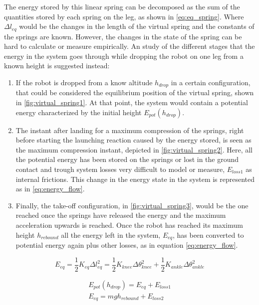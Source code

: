 The energy stored by this linear spring can be decomposed as the sum of the quantities stored by each spring on the leg, as shown in \ref{eq:eq_spring}.
Where $\Delta l_{eq}$ would be the changes in the length of the virtual spring and the constants of the springs are known.
However, the changes in the state of the spring can be hard to calculate or measure empirically.
An study of the different stages that the energy in the system goes through while dropping the robot on one leg from a known height is suggested instead:
\begin{enumerate}
    \item If the robot is dropped from a know altitude $h_{drop}$ in a certain configuration, that could be considered the equilibrium position of the virtual spring, shown in \ref{fig:virtual_spring1}. 
    At that point, the system would contain a potential energy characterized by the initial height $E_{pot}(h_{drop})$.
    \item The instant after landing for a maximum compression of the springs, right before starting the launching reaction caused by the energy stored, is seen as the maximum compression instant, depicted in \ref{fig:virtual_spring2}. 
    Here, all the potential energy has been stored on the springs or lost in the ground contact and trough system losses very difficult to model or measure, $E_{loss1}$ as internal frictions.
    This change in the energy state in the system is represented as in \ref{eq:energy_flow}.
    \item Finally, the take-off configuration, in \ref{fig:virtual_spring3}, would be the one reached once the springs have released the energy and the maximum acceleration upwards is reached. 
    Once the robot has reached its maximum height $h_{rebound}$ all the energy left in the system, $E_{eq}$, has been converted to potential energy again plus other losses, as in equation \ref{eq:energy_flow}.
\end{enumerate}

\begin{equation}
\label{eq:eq_spring}
    E_{eq} = \frac{1}{2}K_{eq}\Delta l^2_{eq} = \frac{1}{2}K_{knee} \Delta \theta^2_{knee} + \frac{1}{2}K_{ankle} \Delta \theta^2_{ankle}
\end{equation}

\begin{equation}
\label{eq:energy_flow}
    \begin{aligned}
        E_{pot}(h_{drop}) = E_{eq} + E_{loss1}\\
        E_{eq} = mg h_{rebound} + E_{loss2}
    \end{aligned}
\end{equation}

